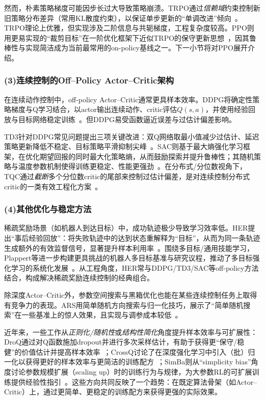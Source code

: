     然而，朴素策略梯度可能因步长过大导致策略崩溃。TRPO通过\emph{信赖域}约束控制新旧策略分布差异（常用KL散度约束），以保证单步更新的“单调改进”倾向~\cite{TRPO_2017}。TRPO理论上优雅，但实现涉及二阶信息与共轭梯度，工程复杂度较高。PPO则用更易实现的“裁剪目标”在一阶优化框架下近似TRPO的保守更新思想~\cite{PPO_2017}，因其鲁棒性与实现简洁成为当前最常用的on-policy基线之一。下一小节将对PPO展开介绍。

  \subsubsection*{(3)连续控制的Off--Policy Actor--Critic架构}
    在连续动作控制中，off-policy Actor--Critic通常更具样本效率。DDPG将确定性策略梯度与Q学习结合，以actor输出连续动作、critic评估$Q(s,a)$，并使用经验回放与目标网络稳定训练~\cite{DDPG_2015}。但DDPG易受函数逼近误差与过估计偏差影响。

    TD3针对DDPG常见问题提出三项关键改进：双Q网络取最小值减少过估计、延迟策略更新降低不稳定、目标策略平滑抑制尖峰~\cite{TD3_2018}。SAC则基于最大熵强化学习框架，在优化期望回报的同时最大化策略熵，从而鼓励探索并提升鲁棒性；其随机策略与温度参数机制使得训练更稳定、性能更强劲~\cite{SAC_2018}。在分布式/分位数视角下，TQC通过\emph{截断}多个分位数critic的尾部来控制过估计偏差，是对连续控制分布式critic的一类有效工程化方案~\cite{TQC_2020}。

  \subsubsection*{(4)其他优化与稳定方法}
    稀疏奖励场景（如机器人到达目标）中，成功轨迹极少导致学习效率低。HER提出“事后经验回放”：将失败轨迹中的达到状态重解释为“目标”，从而为同一条轨迹生成额外的有效监督信号，显著提升样本利用率~\cite{HER_original_2017}。围绕多目标/通用技能学习，Plappert等进一步构建更具挑战的机器人多目标基准与研究议程，推动了多目标强化学习的系统化发展~\cite{plappert2018multigoalreinforcementlearningchallenging}。从工程角度，HER常与DDPG/TD3/SAC等off-policy方法结合，构成解决稀疏奖励连续控制的经典组合。

    除深度Actor--Critic外，参数空间搜索与黑箱优化也能在某些连续控制任务上取得有竞争力的表现。ARS用简单随机方向搜索与归一化技巧，展示了“简单随机搜索”在一些基准上的惊人效果，且实现与调参成本较低~\cite{ARS_2018}。

    近年来，一些工作从\emph{正则化/随机性}或\emph{结构性简化}角度提升样本效率与可扩展性：DroQ通过对Q函数施加dropout并进行多次采样估计，有助于获得更“保守/稳健”的价值估计并提高样本效率~\cite{DroQ_2022}；CrossQ讨论了在深度强化学习中引入（批）归一化以获得更好的样本效率与更简洁的训练配方~\cite{CrossQ_2024}；SimBa则从“simplicity bias”角度讨论参数规模扩展（scaling up）时的训练行为与规律，为大参数RL的可扩展训练提供经验性指引~\cite{SimBa_2025}。这些方向共同反映了一个趋势：在既定算法骨架（如Actor--Critic）上，通过更简单、更稳定的训练配方来获得更强的实际效果。

